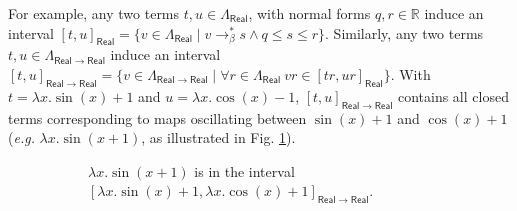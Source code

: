 For example, any two terms $t,u\in \Lambda_{\mathsf{Real}}$, with normal forms $q,r\in \mathbb{R}$ induce an interval $[t,u]_{\mathsf{Real}}= \{v\in \Lambda_{\mathsf{Real}}\mid  v\to_{\beta}^{*} s \land q\leq s\leq r\}$. Similarly, any two terms $t,u\in \Lambda_{\mathsf{Real}\to \mathsf{Real}}$ induce an interval
$[t,u]_{\mathsf{Real}\to \mathsf{Real}}= \{v\in \Lambda_{\mathsf{Real}\to\mathsf{Real}}\mid  
\forall r \in \Lambda_{\mathsf{Real}} \ vr\in [ tr, ur]_{\mathsf{Real}} 
\}$. With $t= \lambda x.\sin(x)+1$ and $u=\lambda x.\cos(x)-1$, 
$[t,u]_{\mathsf{Real}\to \mathsf{Real}}$ contains all closed terms corresponding to maps oscillating between $\sin (x)+1$ and $\cos(x)+1$ (\textit{e.g.} $\lambda x. \sin(x+1)$, as illustrated in Fig. \ref{fig:interval1}).

\begin{figure}
\begin{subfigure}{0.42\textwidth}
\parbox[h][3cm][c]{\textwidth}{
}
\caption{\small $\lambda x.\sin(x+1)$ is in the interval  $[\lambda x.\sin(x)+1, \lambda x.\cos(x)+1]_{\mathsf{Real}\to\mathsf{Real}}$.}
\label{fig:interval1}
\end{subfigure} \ \ \ 
\begin{subfigure}{0.52\textwidth}
\parbox[h][3cm][c]{\textwidth}{
}
\end{subfigure}
\end{figure}
